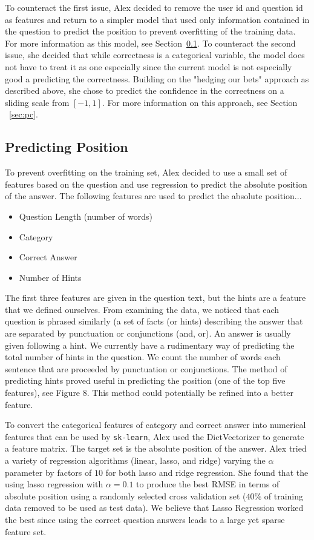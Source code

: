\documentclass[letterpaper]{article}
\begin{document}
To counteract the first issue, Alex decided to remove the user id and question id as features and return to a simpler model that used only information contained in the question to predict the position to prevent overfitting of the training data.  For more information as this model, see Section~\ref{sec:pp}.  To counteract the second issue, she decided that while correctness is a categorical variable, the model does not have to treat it as one especially since the current model is not especially good a predicting the correctness.  Building on the "hedging our bets" approach as described above, she chose to predict the confidence in the correctness on a sliding scale from $[-1,1]$.  For more information on this approach, see Section ~\ref{sec:pc}.

\subsection{Predicting Position}
\label{sec:pp}
To prevent overfitting on the training set, Alex decided to use a small set of features based on the question and use regression to predict the absolute position of the answer.  The following features are used to predict the absolute position...
\begin{itemize}
\item Question Length (number of words)
\item Category
\item Correct Answer
\item Number of Hints
\end{itemize}
The first three features are given in the question text, but the hints are a feature that we defined ourselves.  From examining the data, we noticed that each question is phrased similarly (a set of facts (or hints) describing the answer that are separated by punctuation or conjunctions (and, or).  An answer is usually given following a hint.  We currently have a rudimentary way of predicting the total number of hints in the question.  We count the number of words each sentence that are proceeded by punctuation or conjunctions.  The method of predicting hints proved useful in predicting the position (one of the top five features), see Figure 8.  This method could potentially be refined into a better feature.

\lstset{
  basicstyle=\itshape
  }

To convert the categorical features of category and correct answer into numerical features that can be used by \lstinline{sk-learn}, Alex used the DictVectorizer to generate a feature matrix.  The target set is the absolute position of the answer.  Alex tried a variety of regression algorithms (linear, lasso, and ridge) varying the $\alpha$ parameter by factors of $10$ for both lasso and ridge regression.  She found that the using lasso regression with $\alpha=0.1$ to produce the best RMSE in terms of absolute position using a randomly selected cross validation set ($40\%$ of training data removed to be used as test data).  We believe that Lasso Regression worked the best since using the correct question answers leads to a large yet sparse feature set.
\end{document}
